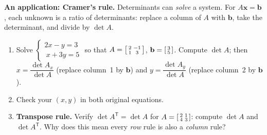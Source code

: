 \documentclass[10pt]{article}
\newcommand{\bb}{\mathbf{b}}
\newcommand{\xx}{\mathbf{x}}
\newcommand{\T}{\mathsf{T}}
\begin{document}
\begin{tcolorbox}[colback=white, colframe=black!40, title=\textbf{Tier E --- Extension},
    fonttitle=\bfseries, arc=1.5mm, left=3mm, right=3mm, top=2mm, bottom=2mm, breakable]
\textbf{An application: Cramer's rule.} Determinants can \emph{solve} a system. For
$A\xx=\bb$, each unknown is a ratio of determinants: replace a column of $A$ with $\bb$, take the
determinant, and divide by $\det A$.
\begin{enumerate}[leftmargin=1.7em, itemsep=9pt]
  \item Solve $\begin{cases} 2x - y = 3 \\ \ x + 3y = 5 \end{cases}$ so that
        $A=\begin{bsmallmatrix} 2 & -1 \\ 1 & 3 \end{bsmallmatrix}$, $\bb=\begin{bsmallmatrix} 3 \\ 5 \end{bsmallmatrix}$.
        Compute $\det A$; then $x=\dfrac{\det A_x}{\det A}$ (replace column~1 by $\bb$) and
        $y=\dfrac{\det A_y}{\det A}$ (replace column~2 by $\bb$). 
  \item Check your $(x,y)$ in both original equations. 
  \item \textbf{Transpose rule.} Verify $\det A^{\T}=\det A$ for
        $A=\begin{bsmallmatrix} 2 & 1 \\ 4 & 3 \end{bsmallmatrix}$: compute $\det A$ and $\det A^{\T}$.
        Why does this mean every \emph{row} rule is also a \emph{column} rule? 
\end{enumerate}
\end{tcolorbox}
\end{document}
